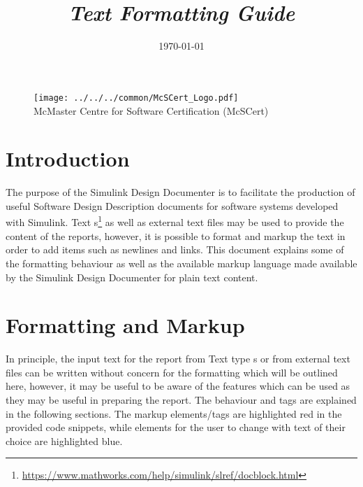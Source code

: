 \documentclass{article}
\title{\ToolName \\[.75em] {\large \textit{Text Formatting Guide}}}
\date{\monthyeardate\today}
\makeatletter
\newcommand{\ToolName}{Simulink Design Documenter\@\xspace}
\newcommand{\sdd}{Software Design Description\@\xspace}
\makeatother
\begin{document}
\maketitle
\vfill

\begin{figure}
	\centering
	\texttt{[image: ../../../common/McSCert\_Logo.pdf]} \\
	McMaster Centre for Software Certification (McSCert)
\end{figure}

\newpage

\section{Introduction}

The purpose of the \ToolName is to facilitate the production of useful \sdd documents for software systems developed with Simulink. Text s\footnote{\url{https://www.mathworks.com/help/simulink/slref/docblock.html}} as well as external text files may be used to provide the content of the reports, however, it is possible to format and markup the text in order to add items such as newlines and links. This document explains some of the formatting behaviour as well as the available markup language made available by the \ToolName for plain text content.

\section{Formatting and Markup}
In principle, the input text for the report from Text type s or from external text files can be written without concern for the formatting which will be outlined here, however, it may be useful to be aware of the features which can be used as they may be useful in preparing the report. The behaviour and tags are explained in the following sections. The markup elements/tags are highlighted red in the provided code snippets, while elements for the user to change with text of their choice are highlighted blue.
\end{document}
